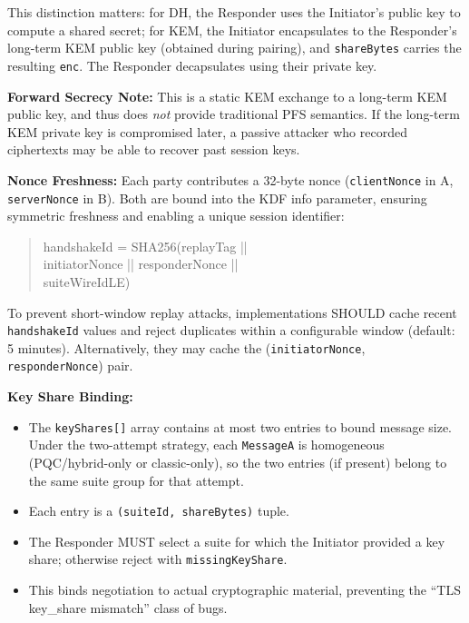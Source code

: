\documentclass[10pt,journal,compsoc]{IEEEtran}
\providecommand{\tightlist}{%
	  \setlength{\itemsep}{0pt}\setlength{\parskip}{0pt}}
\begin{document}
This distinction matters: for DH, the Responder uses the Initiator's
public key to compute a shared secret; for KEM, the Initiator
encapsulates to the Responder's long-term KEM public key (obtained
during pairing), and \texttt{shareBytes} carries the resulting
\texttt{enc}. The Responder decapsulates using their private key.

\textbf{Forward Secrecy Note:} This is a static KEM exchange to a
long-term KEM public key, and thus does \emph{not} provide traditional
PFS semantics. If the long-term KEM private key is compromised later, a
passive attacker who recorded ciphertexts may be able to recover past
session keys.

\textbf{Nonce Freshness:} Each party contributes a 32-byte nonce
(\texttt{clientNonce} in A, \texttt{serverNonce} in B). Both are bound
into the KDF info parameter, ensuring symmetric freshness and enabling a
unique session identifier:

\begin{quote}
\small\ttfamily
handshakeId = SHA256(replayTag ||\\
initiatorNonce || responderNonce ||\\
suiteWireIdLE)
\end{quote}

To prevent short-window replay attacks, implementations SHOULD cache recent
\texttt{handshakeId} values and reject duplicates within a configurable window
(default: 5 minutes). Alternatively, they may cache the
(\texttt{initiatorNonce}, \texttt{responderNonce}) pair.

\textbf{Key Share Binding:}
\begin{itemize}\tightlist
\item
  The \texttt{keyShares[]} array contains at most two entries to bound
  message size. Under the two-attempt strategy, each \texttt{MessageA}
  is homogeneous (PQC/hybrid-only or classic-only), so the two entries
  (if present) belong to the same suite group for that attempt.
\item
  Each entry is a \texttt{(suiteId,\ shareBytes)} tuple.
\item
  The Responder MUST select a suite for which the Initiator provided a
  key share; otherwise reject with \texttt{missingKeyShare}.
\item
  This binds negotiation to actual cryptographic material, preventing
  the ``TLS key\_share mismatch'' class of bugs.
\end{itemize}
\end{document}
